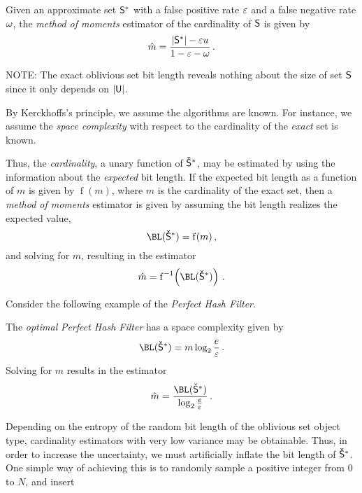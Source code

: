 \documentclass[ ../main.tex]{subfiles}
\begin{document}
Given an approximate set $\ASet{S}$ with a false positive rate $\varepsilon$ and a false negative rate $\omega$, the \emph{method of moments} estimator of the cardinality of $\Set{S}$ is given by
\begin{equation}
\label{eq:exp_St_finite}
    \hat{m} = \frac{\Card{\ASet{S}} - \fprate u}{1 - \fprate - \fnrate}\,.
\end{equation}















NOTE: The exact oblivious set bit length reveals nothing about the size of set $\Set{S}$ since it only depends on $\Card{\Set{U}}$.


By Kerckhoffs's principle, we assume the algorithms are known. For instance, we assume the \emph{space complexity} with respect to the cardinality of the \emph{exact} set is known.

Thus, the \emph{cardinality}, a unary function of $\OASet{S}$, may be estimated by using the information about the \emph{expected} bit length. If the expected bit length as a function of $m$ is given by $\operatorname{f}(m)$, where $m$ is the cardinality of the exact set, then a \emph{method of moments} estimator is given by assuming the bit length realizes the expected value,
\begin{equation}
    \BL(\OASet{S}) = \operatorname{f}(m)\,,
\end{equation}
and solving for $m$, resulting in the estimator
\begin{equation}
    \hat{m} = \operatorname{f}^{-1}\!\left(\BL(\OASet{S})\right)\,.
\end{equation}

Consider the following example of the \emph{Perfect Hash Filter}\cite{phf}.
\begin{example}
The \emph{optimal} \emph{Perfect Hash Filter} has a space complexity given by
\begin{equation}
    \BL(\OASet{S}) = m \log_2 \frac{e}{\fprate}\,.
\end{equation}
Solving for $m$ results in the estimator
\begin{equation}
    \hat{m} = \frac{\BL(\OASet{S})}{\log_2 \frac{e}{\fprate}}\,.
\end{equation}
\end{example}
Depending on the entropy of the random bit length of the oblivious set object type, cardinality estimators with very low variance may be obtainable. Thus, in order to increase the uncertainty, we must artificially inflate the bit length of $\OASet{S}$. One simple way of achieving this is to randomly sample a positive integer from $0$ to $N$, and insert 
\end{document}

